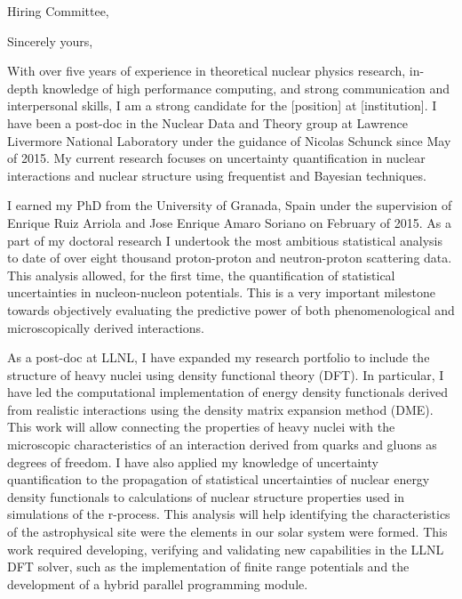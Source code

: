 
\date{\today}
\opening{Hiring Committee,}
\closing{Sincerely yours,}
\makelettertitle

With over five years of experience in theoretical nuclear physics
research, in-depth knowledge of high performance computing, and strong
communication and interpersonal skills, I am a strong candidate for
the [position] at [institution]. I have been a post-doc in the Nuclear
Data and Theory group at Lawrence Livermore National Laboratory under
the guidance of Nicolas Schunck since May of 2015. My current research
focuses on uncertainty quantification in nuclear interactions and
nuclear structure using frequentist and Bayesian techniques.

\quad

I earned my PhD from the University of Granada, Spain under the
supervision of Enrique Ruiz Arriola and Jose Enrique Amaro Soriano on
February of 2015. As a part of my doctoral research I undertook the
most ambitious statistical analysis to date of over eight thousand
proton-proton and neutron-proton scattering data. This analysis
allowed, for the first time, the quantification of statistical
uncertainties in nucleon-nucleon potentials. This is a very important
milestone towards objectively evaluating the predictive power of both
phenomenological and microscopically derived interactions.

\quad

As a post-doc at LLNL, I have expanded my research portfolio to
include the structure of heavy nuclei using density functional theory
(DFT). In particular, I have led the computational implementation of
energy density functionals derived from realistic interactions using
the density matrix expansion method (DME). This work will allow
connecting the properties of heavy nuclei with the microscopic
characteristics of an interaction derived from quarks and gluons as
degrees of freedom. I have also applied my knowledge of uncertainty
quantification to the propagation of statistical uncertainties of
nuclear energy density functionals to calculations of nuclear
structure properties used in simulations of the r-process. This
analysis will help identifying the characteristics of the
astrophysical site were the elements in our solar system were
formed. This work required developing, verifying and validating new
capabilities in the LLNL DFT solver, such as the implementation of
finite range potentials and the development of a hybrid parallel
programming module.

